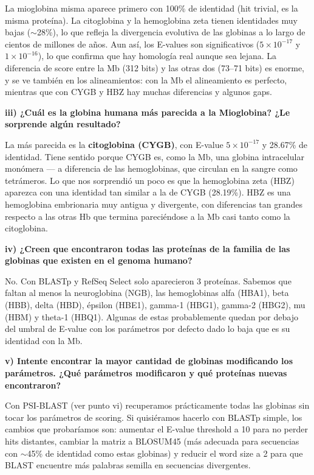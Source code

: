 La mioglobina misma aparece primero con 100\% de identidad (hit trivial, es la misma proteína). La
citoglobina y la hemoglobina zeta tienen identidades muy bajas ($\sim$28\%), lo que refleja la divergencia
evolutiva de las globinas a lo largo de cientos de millones de años. Aun así, los E-values son
significativos ($5 \times 10^{-17}$ y $1 \times 10^{-16}$), lo que confirma que hay homología real
aunque sea lejana. La diferencia de score entre la Mb (312 bits) y las otras dos (73--71 bits) es enorme,
y se ve también en los alineamientos: con la Mb el alineamiento es perfecto, mientras que con CYGB y HBZ
hay muchas diferencias y algunos gaps.

\textbf{iii) ¿Cuál es la globina humana más parecida a la Mioglobina? ¿Le sorprende algún resultado?}

La más parecida es la \textbf{citoglobina (CYGB)}, con E-value $5 \times 10^{-17}$ y 28.67\% de identidad.
Tiene sentido porque CYGB es, como la Mb, una globina intracelular monómera --- a diferencia de las
hemoglobinas, que circulan en la sangre como tetrámeros. Lo que nos sorprendió un poco es que la
hemoglobina zeta (HBZ) aparezca con una identidad tan similar a la de CYGB (28.19\%). HBZ es una
hemoglobina embrionaria muy antigua y divergente, con diferencias tan grandes respecto a las otras Hb
que termina pareciéndose a la Mb casi tanto como la citoglobina.

\textbf{iv) ¿Creen que encontraron todas las proteínas de la familia de las globinas que existen en el
genoma humano?}

No. Con BLASTp y RefSeq Select solo aparecieron 3 proteínas. Sabemos que faltan al menos la neuroglobina
(NGB), las hemoglobinas alfa (HBA1), beta (HBB), delta (HBD), épsilon (HBE1), gamma-1 (HBG1),
gamma-2 (HBG2), mu (HBM) y theta-1 (HBQ1). Algunas de estas probablemente quedan por debajo del umbral
de E-value con los parámetros por defecto dado lo baja que es su identidad con la Mb.

\textbf{v) Intente encontrar la mayor cantidad de globinas modificando los parámetros. ¿Qué parámetros
modificaron y qué proteínas nuevas encontraron?}

Con PSI-BLAST (ver punto vi) recuperamos prácticamente todas las globinas sin tocar los parámetros de
scoring. Si quisiéramos hacerlo con BLASTp simple, los cambios que probaríamos son: aumentar el E-value
threshold a 10 para no perder hits distantes, cambiar la matriz a BLOSUM45 (más adecuada para secuencias
con $\sim$45\% de identidad como estas globinas) y reducir el word size a 2 para que BLAST encuentre más
palabras semilla en secuencias divergentes.

